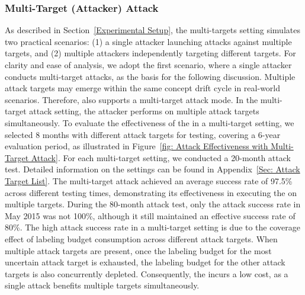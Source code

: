 \subsubsection{Multi-Target (Attacker) Attack} 
\label{Sec: Multi Attack Targets}
As described in Section~\ref{Experimental Setup}, the multi-targets setting simulates two practical scenarios: (1) a single attacker launching attacks against multiple targets, and (2) multiple attackers independently targeting different targets.
For clarity and ease of analysis, we adopt the first scenario, where a single attacker conducts multi-target attacks, as the basis for the following discussion.
Multiple attack targets may emerge within the same concept drift cycle in real-world scenarios. 
Therefore, \pandora also supports a multi-target attack mode.
In the multi-target attack setting, the attacker performs \pandora on multiple attack targets simultaneously.
To evaluate the effectiveness of the \pandora in a multi-target setting, we selected 8 months with different attack targets for testing, covering a 6-year evaluation period, as illustrated in Figure~\ref{fig: Attack Effectiveness with Multi-Target Attack}.
For each multi-target setting, we conducted a 20-month attack test.
Detailed information on the settings can be found in Appendix~\ref{Sec: Attack Target List}.
The multi-target attack achieved an average success rate of 97.5\% across different testing times, demonstrating its effectiveness in executing the \pandora on multiple targets.
During the 80-month attack test, only the attack success rate in May 2015 was not 100\%, although it still maintained an effective success rate of 80\%.
The high attack success rate in a multi-target setting is due to the coverage effect of labeling budget consumption across different attack targets.
When multiple attack targets are present, once the labeling budget for the most uncertain attack target is exhausted, the labeling budget for the other attack targets is also concurrently depleted.
Consequently, the \pandora incurs a low cost, as a single attack benefits multiple targets simultaneously.

